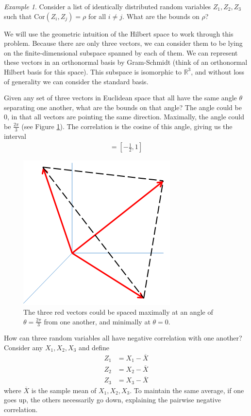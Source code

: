 \documentclass[11pt]{article}
\newcommand{\R}{\ensuremath{\mathbb R}}
\theoremstyle{plain}
\theoremstyle{definition}
\theoremstyle{remark}
\newtheorem{exm}{Example}[section]
\begin{document}
\begin{exm}
    Consider a list of identically distributed random variables $Z_1, Z_2, Z_3$ such that $\text{Cor}(Z_i, Z_j) = \rho$ for all $i \neq j$. What are the bounds on $\rho$?
    
    We will use the geometric intuition of the Hilbert space to work through this problem. Because there are only three vectors, we can consider them to be lying on the finite-dimensional subspace spanned by each of them. We can represent these vectors in an orthonormal basis by Gram-Schmidt (think of an orthonormal Hilbert basis for this space). This subspace is isomorphic to $\R^3$, and without loss of generality we can consider the standard basis.
    
    Given any set of three vectors in Euclidean space that all have the same angle $\theta$ separating one another, what are the bounds on that angle? The angle could be 0, in that all vectors are pointing the same direction. Maximally, the angle could be $\frac{2\pi}{3}$ (see Figure \ref{fig:three_vecs}). The correlation is the cosine of this angle, giving us the interval
    \begin{align*}
        [\cos(\tfrac{2\pi}{3}), \cos(0)] = [-\tfrac{1}{2}, 1]
    \end{align*}
    \begin{figure}
        \centering
        \includegraphics[width=0.5\linewidth]{figures/three_vecs.png}
        \caption{The three red vectors could be spaced maximally at an angle of $\theta = \frac{2\pi}{3}$ from one another, and minimally at $\theta = 0$.}
        \label{fig:three_vecs}
    \end{figure}
    How can three random variables all have negative correlation with one another? Consider any $X_1, X_2, X_3$ and define
    \begin{align*}
        Z_1 &= X_1 - \overline{X}\\
        Z_2 &= X_2 - \overline{X}\\
        Z_3 &= X_3 - \overline{X}
    \end{align*}
    where $\overline{X}$ is the sample mean of $X_1, X_2, X_3$. To maintain the same average, if one goes up, the others necessarily go down, explaining the pairwise negative correlation.
\end{exm}
\end{document}
